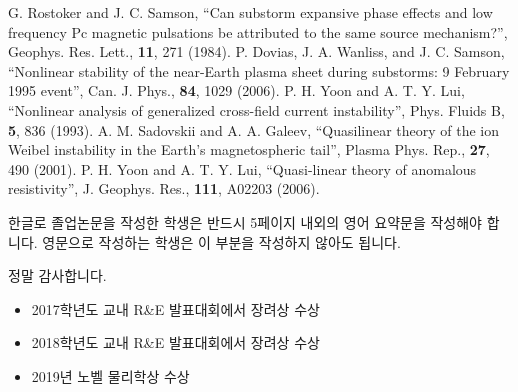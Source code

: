 \documentclass[twoside,11pt]{gshs_thesis}
\begin{document}
\begin{thebibliography}{99}
\begin{onehalfspace}
 G. Rostoker and J. C. Samson, ``Can substorm expansive phase effects and low frequency Pc magnetic pulsations be attributed to the same source mechanism?'', Geophys. Res. Lett., {\bf 11}, 271 (1984).
 P. Dovias, J. A. Wanliss, and J. C. Samson, ``Nonlinear stability of the near-Earth plasma sheet during substorms: 9 February 1995 event'', Can. J. Phys., {\bf 84}, 1029 (2006).
 P. H. Yoon and A. T. Y. Lui, ``Nonlinear analysis of generalized cross-field current instability'', Phys. Fluids B, {\bf 5}, 836 (1993).
 A. M. Sadovskii and A. A. Galeev, ``Quasilinear theory of the ion Weibel instability in the Earth's magnetospheric tail'', Plasma Phys. Rep., {\bf 27}, 490 (2001).
 P. H. Yoon and A. T. Y. Lui, ``Quasi-linear theory of anomalous resistivity'', J. Geophys. Res., {\bf 111}, A02203 (2006).

\end{onehalfspace}\end{thebibliography}

\begin{summary}
한글로 졸업논문을 작성한 학생은 반드시 5페이지 내외의 영어 요약문을 작성해야 합니다. 영문으로 작성하는 학생은 이 부분을 작성하지 않아도 됩니다.
\end{summary}

\begin{acknowledgements}
정말 감사합니다.
\end{acknowledgements}

\begin{researches}
\begin{itemize}
\item{2017학년도 교내 R\&E 발표대회에서 장려상 수상}
\item{2018학년도 교내 R\&E 발표대회에서 장려상 수상}
\item{2019년 노벨 물리학상 수상}
\end{itemize}
\end{researches}
\end{document}
